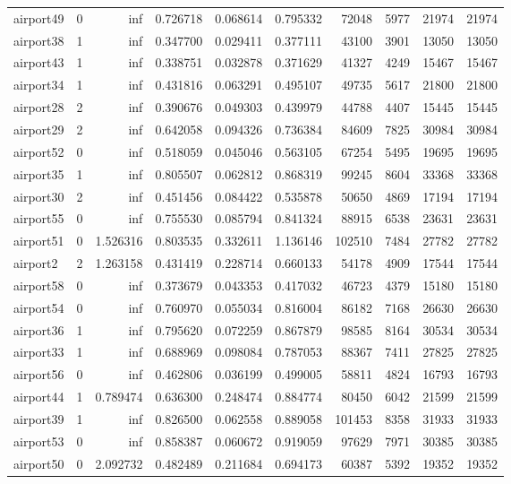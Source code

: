 \begin{longtable}{|l|r|r|r|r|r|r|r|r|r|}
airport49 & 0 & inf & 0.726718 & 0.068614 & 0.795332 & 72048 & 5977 & 21974 & 21974 \\
airport38 & 1 & inf & 0.347700 & 0.029411 & 0.377111 & 43100 & 3901 & 13050 & 13050 \\
airport43 & 1 & inf & 0.338751 & 0.032878 & 0.371629 & 41327 & 4249 & 15467 & 15467 \\
airport34 & 1 & inf & 0.431816 & 0.063291 & 0.495107 & 49735 & 5617 & 21800 & 21800 \\
airport28 & 2 & inf & 0.390676 & 0.049303 & 0.439979 & 44788 & 4407 & 15445 & 15445 \\
airport29 & 2 & inf & 0.642058 & 0.094326 & 0.736384 & 84609 & 7825 & 30984 & 30984 \\
airport52 & 0 & inf & 0.518059 & 0.045046 & 0.563105 & 67254 & 5495 & 19695 & 19695 \\
airport35 & 1 & inf & 0.805507 & 0.062812 & 0.868319 & 99245 & 8604 & 33368 & 33368 \\
airport30 & 2 & inf & 0.451456 & 0.084422 & 0.535878 & 50650 & 4869 & 17194 & 17194 \\
airport55 & 0 & inf & 0.755530 & 0.085794 & 0.841324 & 88915 & 6538 & 23631 & 23631 \\
airport51 & 0 & 1.526316 & 0.803535 & 0.332611 & 1.136146 & 102510 & 7484 & 27782 & 27782 \\
airport2 & 2 & 1.263158 & 0.431419 & 0.228714 & 0.660133 & 54178 & 4909 & 17544 & 17544 \\
airport58 & 0 & inf & 0.373679 & 0.043353 & 0.417032 & 46723 & 4379 & 15180 & 15180 \\
airport54 & 0 & inf & 0.760970 & 0.055034 & 0.816004 & 86182 & 7168 & 26630 & 26630 \\
airport36 & 1 & inf & 0.795620 & 0.072259 & 0.867879 & 98585 & 8164 & 30534 & 30534 \\
airport33 & 1 & inf & 0.688969 & 0.098084 & 0.787053 & 88367 & 7411 & 27825 & 27825 \\
airport56 & 0 & inf & 0.462806 & 0.036199 & 0.499005 & 58811 & 4824 & 16793 & 16793 \\
airport44 & 1 & 0.789474 & 0.636300 & 0.248474 & 0.884774 & 80450 & 6042 & 21599 & 21599 \\
airport39 & 1 & inf & 0.826500 & 0.062558 & 0.889058 & 101453 & 8358 & 31933 & 31933 \\
airport53 & 0 & inf & 0.858387 & 0.060672 & 0.919059 & 97629 & 7971 & 30385 & 30385 \\
airport50 & 0 & 2.092732 & 0.482489 & 0.211684 & 0.694173 & 60387 & 5392 & 19352 & 19352 \\

\end{longtable}

